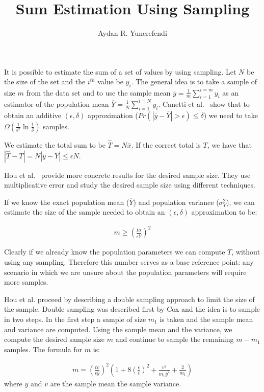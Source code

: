 \documentclass{article}
\author{Aydan R. Yunerefendi}
\title{Sum Estimation Using Sampling}
\begin{document}
\maketitle

  It is possible to estimate the sum of a set of values by using
  sampling. Let $N$ be the size of the set and the $i^{th}$ value be
  $y_i$. The general idea is to take a sample of size $m$ from the
  data set and to use the sample mean $\overline{y} =
  \frac{1}{m}\sum_{i=1}^{i=m}y_i$ as an estimator of the population
  mean $\overline{Y} = \frac{1}{N}\sum_{i=1}^{i=N}y_i$. Canetti et
  al.~\cite{canetti94lower} show that to obtain an additive
  $(\epsilon, \delta)$ approximation ($Pr(|\overline{y}-\overline{Y}|
  > \epsilon) \leq \delta$) we need to take
  $\Omega(\frac{1}{\epsilon^2}\ln\frac{1}{\delta})$ samples. 

  We estimate the total sum to be $\widehat{T} = N\overline{x}$. If
  the correct total is $T$, we have that $|\widehat{T}-T| =
  N|\overline{y}-\overline{Y}| \leq \epsilon N$. 

  Hou et al.~\cite{hou91error} provide more concrete results for the
  desired sample size. They use multiplicative error and study the
  desired sample size using different techniques.

  If we know the exact population mean ($\overline{Y}$) and population
  variance ($\sigma_{Y}^2$), we can estimate the size of the sample
  needed to obtain an $(\epsilon, \delta)$ approximation to be:

  \begin{eqnarray*}
    m \geq (\frac{t\sigma}{\epsilon\overline{Y}})^2
  \end{eqnarray*}

  Clearly if we already know the population parameters we can compute
  $T$, without using any sampling. Therefore this number serves as a
  base reference point: any scenario in which we are unsure about the
  population parameters will require more samples.

  Hou et al. proceed by describing a double sampling approach to limit
  the size of the sample. Double sampling was described first by Cox
  and the idea is to sample in two steps. In the first step a sample
  of size $m_1$ is taken and the sample mean and variance are
  computed. Using the sample mean and the variance, we compute the
  desired sample size $m$ and continue to sample the remaining $m-m_1$
  samples. The formula for $m$ is:

  \begin{eqnarray*}
    m = (\frac{tv}{\epsilon \overline{y}})^2(1 +
    8(\frac{\epsilon}{t})^2 + \frac{v^2}{m_1\overline{y}^2} +
    \frac{2}{m_1})
  \end{eqnarray*}
  where $\overline{y}$ and $v$ are the sample mean the sample
  variance.
\end{document}
